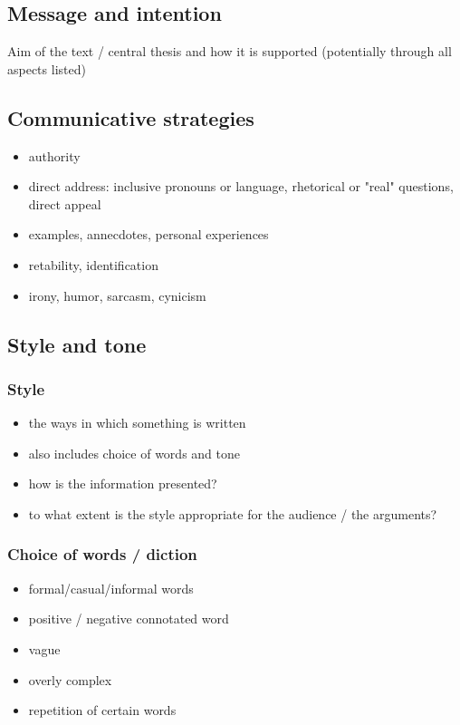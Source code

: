 \documentclass{article}
\begin{document}
	\subsection{Message and intention}
	Aim of the text / central thesis and how it is supported (potentially through all aspects listed)

	\subsection{Communicative strategies}
	
	\begin{itemize}
		\item authority
		\item direct address: inclusive pronouns or language, rhetorical or "real" questions, direct appeal
		\item examples, annecdotes, personal experiences
		\item retability, identification
		\item irony, humor, sarcasm, cynicism
	\end{itemize}

	\subsection{Style and tone}

	\subsubsection{Style}
	\begin{itemize}
		\item the ways in which something is written
		\item also includes choice of words and tone
		\item how is the information presented?
		\item to what extent is the style appropriate for the audience / the arguments?
	\end{itemize}

	\subsubsection{Choice of words / diction}
	\begin{itemize}
		\item formal/casual/informal words
		\item positive / negative connotated word
		\item vague
		\item overly complex
		\item repetition of certain words
	\end{itemize}
\end{document}
